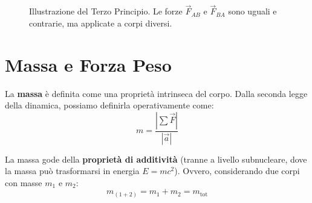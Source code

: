 \begin{figure}[ht]
    \centering
    \caption{Illustrazione del Terzo Principio. Le forze $\vec{F}_{AB}$ e $\vec{F}_{BA}$ sono uguali e contrarie, ma applicate a corpi diversi.}
    \label{fig:terzo_principio}
\end{figure}

\section{Massa e Forza Peso}
\label{sec:massa_peso}

La \textbf{massa} è definita come una proprietà intrinseca del corpo.
Dalla seconda legge della dinamica, possiamo definirla operativamente come:
\begin{equation}
    m = \frac{|\sum \vec{F}|}{|\vec{a}|}
\end{equation}

La massa gode della \textbf{proprietà di additività} (tranne a livello subnucleare, dove la massa può trasformarsi in energia $E=mc^2$). Ovvero, considerando due corpi con masse $m_1$ e $m_2$:
\begin{equation}
    m_{(1+2)} = m_1 + m_2 = m_{\text{tot}}
\end{equation}

